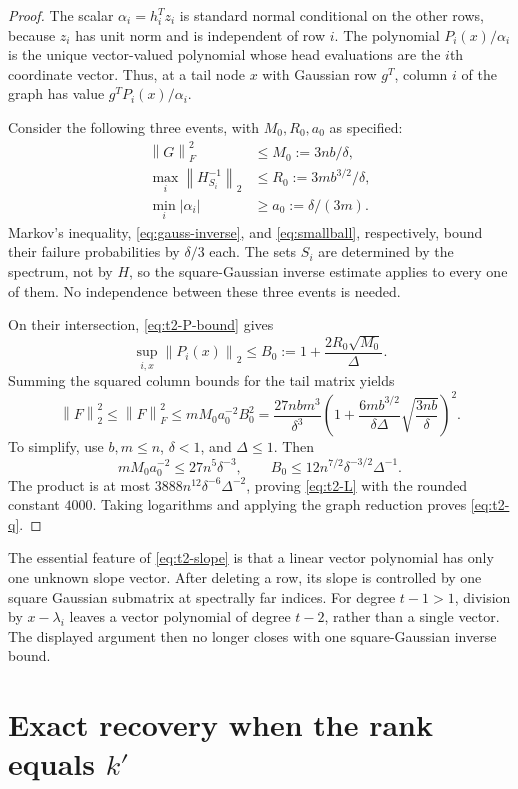 \documentclass[11pt]{article}
\theoremstyle{definition}
\newcommand{\norm}[1]{\left\lVert #1\right\rVert}
\begin{document}
\begin{proof}
The scalar $\alpha_i=h_i^Tz_i$ is standard normal conditional on the other
rows, because $z_i$ has unit norm and is independent of row $i$.
The polynomial $P_i(x)/\alpha_i$ is the unique vector-valued polynomial
whose head evaluations are the $i$th coordinate vector. Thus, at a tail
node $x$ with Gaussian row $g^T$, column $i$ of the graph has value
$g^TP_i(x)/\alpha_i$.

Consider the following three events, with $M_0,R_0,a_0$ as specified:
\begin{align*}
 \norm{G}_F^2&\leq M_0:=3nb/\delta,\\
 \max_i\norm{H_{S_i}^{-1}}_2&\leq R_0:=3mb^{3/2}/\delta,\\
 \min_i|\alpha_i|&\geq a_0:=\delta/(3m).
\end{align*}
Markov's inequality, \eqref{eq:gauss-inverse}, and
\eqref{eq:smallball}, respectively, bound their failure probabilities by
$\delta/3$ each. The sets $S_i$ are determined by the spectrum, not by $H$,
so the square-Gaussian inverse estimate applies to every one of them.
No independence between these three events is needed.

On their intersection, \eqref{eq:t2-P-bound} gives
\[
 \sup_{i,x}\norm{P_i(x)}_2\leq
 B_0:=1+\frac{2R_0\sqrt{M_0}}\Delta.
\]
Summing the squared column bounds for the tail matrix yields
\begin{equation}
 \norm{F}_2^2\leq\norm{F}_F^2
 \leq mM_0a_0^{-2}B_0^2
 =\frac{27nbm^3}{\delta^3}
       \left(1+\frac{6mb^{3/2}}{\delta\Delta}
                         \sqrt{\frac{3nb}\delta}\right)^2.
 \label{eq:t2-unsimplified}
\end{equation}
To simplify, use $b,m\leq n$, $\delta<1$, and $\Delta\leq1$. Then
\[
 mM_0a_0^{-2}\leq27n^5\delta^{-3},\qquad
 B_0\leq12n^{7/2}\delta^{-3/2}\Delta^{-1}.
\]
The product is at most $3888n^{12}\delta^{-6}\Delta^{-2}$, proving
\eqref{eq:t2-L} with the rounded constant $4000$.
Taking logarithms and applying the graph reduction proves
\eqref{eq:t2-q}.
\end{proof}

The essential feature of \eqref{eq:t2-slope} is that a linear vector
polynomial has only one unknown slope vector. After deleting a row, its
slope is controlled by one square Gaussian submatrix at spectrally far
indices. For degree $t-1>1$, division by $x-\lambda_i$ leaves a vector
polynomial of degree $t-2$, rather than a single vector. The displayed
argument then no longer closes with one square-Gaussian inverse bound.

\section{Exact recovery when the rank equals \texorpdfstring{$k'$}{k-prime}}
\label{sec:rankexact}
\end{document}
